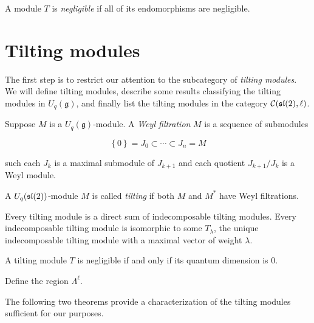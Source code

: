 \begin{defn}
    A module $T$ is \emph{negligible} if all of its endomorphisms are negligible.
\end{defn}
\section{Tilting modules} 

The first step is to restrict our attention to the subcategory of \emph{tilting
modules}. We will define tilting modules, describe some results classifying the
tilting modules in $U_q(\mathfrak{g})$, and finally list the tilting modules in
the category $\mathcal{C}(\mathfrak{sl}(2), \ell)$.

\begin{defn}
    Suppose $M$ is a $U_q(\mathfrak{g})$-module. A \emph{Weyl filtration} $M$
    is a sequence of submodules 

    \begin{equation}
        \left\{ 0 \right\} = J_0 \subset \cdots \subset J_n = M
    \end{equation}

    such each $J_k$ is a maximal submodule of $J_{k+1}$ and each quotient $J_{k+1}/J_k$ is a Weyl module. 
\end{defn}

\begin{defn}
    A $U_q(\mathfrak{sl}(2))$-module $M$ is called \emph{tilting} if both $M$ and $M^*$ have Weyl filtrations.
\end{defn}


\begin{theorem}
    Every tilting module is a direct sum of indecomposable tilting modules.
    Every indecomposable tilting module is isomorphic to some $T_\lambda$, the
    unique indecomposable tilting module with a maximal vector of weight
    $\lambda$.
\end{theorem}



\begin{lemma}
    A tilting module $T$ is negligible if and only if its quantum dimension is 0.
\end{lemma}

Define the region $\Lambda^\ell$.

The following two theorems provide a characterization of the tilting modules
sufficient for our purposes.

